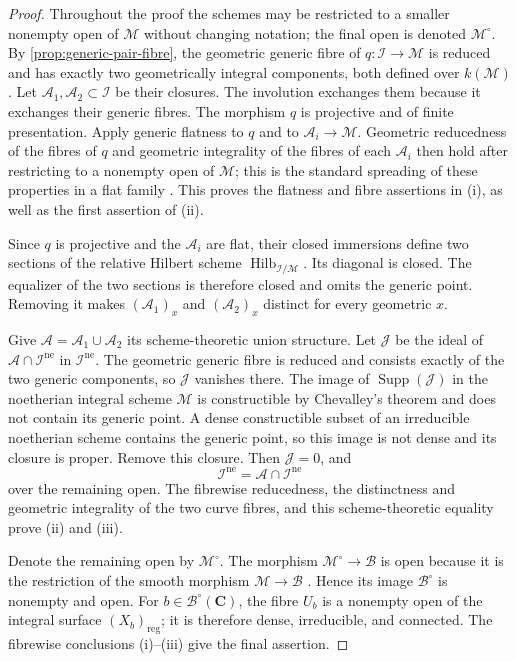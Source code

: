 \documentclass[10pt]{amsart}
\numberwithin{equation}{section}
\theoremstyle{definition}
\theoremstyle{remark}
\newcommand{\CC}{\mathbf C}
\newcommand{\reg}{\mathrm{reg}}
\newcommand{\cI}{\mathcal I}
\newcommand{\cM}{\mathcal M}
\newcommand{\cB}{\mathcal B}
\newcommand{\cA}{\mathcal A}
\begin{document}
\begin{proof}
Throughout the proof the schemes may be restricted to a smaller nonempty
open of $\cM$ without changing notation; the final open is denoted
$\cM^\circ$.
By \cref{prop:generic-pair-fibre}, the geometric generic fibre of
$q:\cI\to\cM$ is reduced and has exactly two geometrically integral
components, both defined over $k(\cM)$.  Let
$\cA_1,\cA_2\subset\cI$ be their closures.  The involution exchanges them
because it exchanges their generic fibres.
The morphism $q$ is projective and of finite presentation.  Apply generic
flatness to $q$ and to $\cA_i\to\cM$.  Geometric reducedness of the fibres of
$q$ and geometric integrality of the fibres of each $\cA_i$ then hold after
restricting to a nonempty open of $\cM$; this is the standard spreading of
these properties in a flat family \cite[\href{https://stacks.math.columbia.edu/tag/052A}{Tag 052A};
\href{https://stacks.math.columbia.edu/tag/0578}{Tag 0578};
\href{https://stacks.math.columbia.edu/tag/0559}{Tag 0559}]{stacks-project}.  This proves the
flatness and fibre assertions in (i), as well as the first assertion of (ii).

Since $q$ is projective and the $\cA_i$ are flat, their closed immersions
define two sections of the relative Hilbert scheme
$\operatorname{Hilb}_{\cI/\cM}$.  Its diagonal is closed.  The equalizer of
the two sections is therefore closed and omits the generic point.  Removing
it makes $(\cA_1)_x$ and $(\cA_2)_x$ distinct for every geometric $x$.

Give $\cA=\cA_1\cup\cA_2$ its scheme-theoretic union structure.  Let
$\mathcal J$ be the ideal of $\cA\cap\cI^{\mathrm{ne}}$ in
$\cI^{\mathrm{ne}}$.  The geometric generic fibre is reduced and consists
exactly of the two generic components, so $\mathcal J$ vanishes there.  The
image of $\operatorname{Supp}(\mathcal J)$ in the noetherian integral scheme
$\cM$ is constructible by Chevalley's theorem and does not contain its generic
point.  A dense constructible subset of an irreducible noetherian scheme
contains the generic point, so this image is not dense and its closure is
proper.  Remove this closure.  Then
$\mathcal J=0$, and
\[
 \cI^{\mathrm{ne}}=\cA\cap\cI^{\mathrm{ne}}
\]
over the remaining open.  The fibrewise reducedness, the distinctness and
geometric integrality of the two curve fibres, and this scheme-theoretic
equality prove (ii) and (iii).

Denote the remaining open by $\cM^\circ$.
The morphism $\cM^\circ\to\cB$ is open because it is the restriction of the
smooth morphism $\cM\to\cB$ \cite[\href{https://stacks.math.columbia.edu/tag/056G}{Tag 056G}]{stacks-project}.  Hence its image
$\cB^\circ$ is nonempty and open.  For $b\in\cB^\circ(\CC)$, the fibre
$U_b$ is a nonempty open of the integral surface $(X_b)_{\reg}$; it is
therefore dense, irreducible, and connected.  The fibrewise conclusions
(i)--(iii) give the final assertion.
\end{proof}
\end{document}
